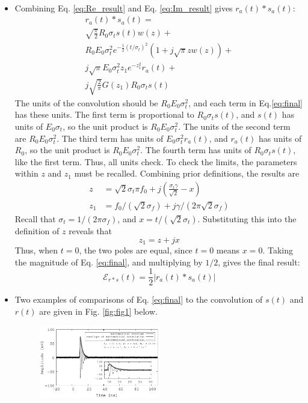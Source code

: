 \documentclass[amsmath,amssymb,aps,prd,10pt,twocolumn,showkeys]{revtex4}
\begin{document}
\begin{itemize}
\begin{multline}
\end{multline}
\item Combining Eq. \ref{eq:Re_result} and Eq. \ref{eq:Im_result} gives $r_a(t) * s_a(t)$:
\begin{multline}
r_a(t) * s_a(t) = \\
\sqrt{\frac{\pi}{2}}R_0 \sigma_t s(t) w(z) + \\
R_0 E_0 \sigma_t^2 e^{-\frac{1}{2}(t/\sigma_t)^2}(1+j\sqrt{\pi} z w(z)) + \\
j\sqrt{\pi}E_0 \sigma_t^2 z_1 e^{-z_1^2}r_a(t) + \\
j\sqrt{\frac{2}{\pi}} G(z_1) R_0 \sigma_t s(t) \label{eq:final}
\end{multline}
The units of the convolution should be $R_0 E_0\sigma_t^2$, and each term in Eq.\ref{eq:final} has these units.  The first term is proportional to $R_0 \sigma_t s(t)$, and $s(t)$ has units of $E_0 \sigma_t$, so the unit product is $R_0 E_0\sigma_t^2$.  The units of the second term are $R_0 E_0\sigma_t^2$.  The third term has units of $E_0\sigma_t^2 r_a(t)$, and $r_a(t)$ has units of $R_0$, so the unit product is $R_0 E_0\sigma_t^2$.  The fourth term has units of $R_0 \sigma_t s(t)$, like the first term.  Thus, all units check.  To check the limits, the parameters within $z$ and $z_1$ must be recalled.  Combining prior definitions, the results are
\begin{align}
z &= \sqrt{2}\sigma_t \pi f_0 + j\left(\frac{\sigma_t\gamma}{\sqrt{2}} - x\right) \\
z_1 &= f_0/(\sqrt{2}\sigma_f) + j\gamma/(2\pi \sqrt{2} \sigma_f)
\end{align}
Recall that $\sigma_t = 1/(2\pi \sigma_f)$, and $x=t/(\sqrt{2}\sigma_t)$.  Substituting this into the definition of $z$ reveals that
\begin{equation}
z_1 = z + jx
\end{equation}
Thus, when $t=0$, the two poles are equal, since $t=0$ means $x=0$.  Taking the magnitude of Eq. \ref{eq:final}, and multiplying by $1/2$, gives the final result:
\begin{equation}
\mathcal{E}_{r * s}(t) = \frac{1}{2} | r_a(t) * s_a(t) |
\end{equation}
\item Two examples of comparisons of Eq. \ref{eq:final} to the convolution of $s(t)$ and $r(t)$ are given in Fig. \ref{fig:fig1} below.
\begin{figure}[hb]
\centering
\includegraphics[width=0.5\textwidth]{March12_plot1.pdf}

\end{figure}
\end{itemize}
\end{document}
